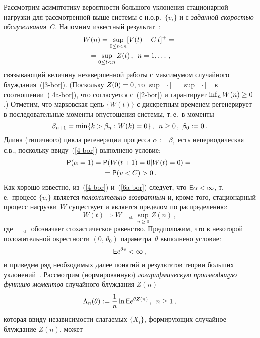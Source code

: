 \begin{multicols}{2}
Рассмотрим  асимптотику вероятности большого уклонения стационарной
нагрузки для рас\-смот\-рен\-ной выше системы с н.о.р.\ $\{v_i\}$ и с
{\it заданной скоростью обслуживания}~$C$. Напомним известный
результат~\cite{Asmus}:
\begin{multline}
W(n)=
\sup\limits_{0\le t< n}[V(t)-C\,t]^+={}\\
{}=\sup\limits_{0\le t<n}Z(t)\,,\enskip
n=1,\ldots\,,
\label{4a-bor}
\end{multline}
связывающий  величину незавершенной работы с максимумом
 случайного блуждания~(\ref{3-bor}).  (Поскольку $Z(0)\hm=0$, то
$\sup[\cdot]=\sup[\cdot]^+$ в  соотношении~(\ref{4a-bor}), что
согласуется с~(\ref{2-bor}) и гарантирует $\inf_nW(n)\hm\ge 0$.)
 Отметим, что марковская цепь $\{W(t)\}$ с дискретным временем
регенерирует в последовательные моменты  опустошения системы, т.\,е.\ в моменты
$$
\beta_{n+1}=\min\{k>\beta_n: W(k)=0\}\,,\enskip n\ge 0\,,\ \beta_0:=0\,.
$$
Длина (типичного) цикла регенерации процесса $\alpha:=\beta_1$ есть
непериодическая с.в., поскольку ввиду~(\ref{4-bor}) выполнено условие:
\begin{multline}
{\sf P}(\alpha=1)={\sf P}(W(t+1)=0|W(t)=0)={}\\{}={\sf P}(v<C)>0\,. \label{6a-bor}
\end{multline}
Как хорошо известно, из~(\ref{4-bor}) и~(\ref{6a-bor}) следует, что $\e
\alpha\hm<\infty$, т.\,е.\ процесс $\{v_i\}$ является {\it положительно
возвратным} и, кроме того, стационарный процесс нагрузки~$W$
существует и является пределом  по распределению:
\begin{equation*}
W(t)\Rightarrow W=_{\mathrm{st}}\sup_{n\ge 0} Z(n)\,, %
\end{equation*}
где $=_{\mathrm{st}}$  обозначает стохастическое равенство. %
 Предположим, что в некоторой положительной
 окрестности  $(0,\,\theta_0)$ параметра~$\theta$  выполнено условие:
\begin{equation}
{\sf E} e^{\theta v}<\infty\,, \label{7-bor}
\end{equation}
и приведем ряд  необходимых далее   понятий и результатов теории
 больших уклонений~\cite{Ganesh}.
Рассмотрим (нормированную)  {\it логарифмическую производящую
функцию моментов} случайного блуждания $Z(n)$
\begin{equation*}
\Lambda_n(\theta):=\displaystyle\frac{\displaystyle 1\mathstrut}{\displaystyle n\mathstrut}\ln{\sf E} e^{\theta Z(n)}\,,\enskip n\ge1\,,
\end{equation*}
которая ввиду независимости
 слагаемых $\{X_i\}$, формирующих случайное блуждание $Z(n)$, может

\end{multicols}
